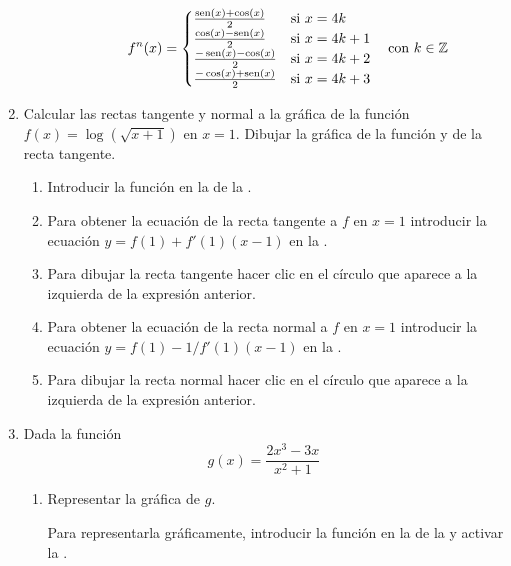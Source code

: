 \begin{enumerate}[leftmargin=*]
\begin{enumerate}
\begin{indication}
\begin{enumerate}
                  \[
                  f^n(x)=
                  \begin{cases}
                  \frac{\operatorname{sen}(x)+\cos(x)}{2}  & \mbox{si $x=4k$}   \\
                  \frac{\cos(x)-\operatorname{sen}(x)}{2}  & \mbox{si $x=4k+1$} \\
                  \frac{-\operatorname{sen}(x)-\cos(x)}{2} & \mbox{si $x=4k+2$} \\
                  \frac{-\cos(x)+\operatorname{sen}(x)}{2} & \mbox{si $x=4k+3$} \\
                  \end{cases}
                  \quad \mbox{con $k\in \mathbb{Z}$}
                  \]
            \end{enumerate}
            \end{indication}
      \end{enumerate}

\item Calcular las rectas tangente y normal a la gráfica de la función $f(x)=\log(\sqrt{x+1})$ en $x=1$.
      Dibujar la gráfica de la función y de la recta tangente.
      \begin{indication}
      \begin{enumerate}
      \item Introducir la función  en la  de la .
      \item Para obtener la ecuación de la recta tangente a $f$ en $x=1$ introducir la ecuación $y=f(1)+f'(1)(x-1)$ en la .
      \item Para dibujar la recta tangente hacer clic en el círculo que aparece a la izquierda de la expresión anterior.
      \item Para obtener la ecuación de la recta normal a $f$ en $x=1$ introducir la ecuación $y=f(1)-1/f'(1)(x-1)$ en la .
      \item Para dibujar la recta normal hacer clic en el círculo que aparece a la izquierda de la expresión anterior.
      \end{enumerate}
      \end{indication}



\item Dada la función
      \[
      g(x)=\dfrac{2x^{3}-3x}{x^{2}+1}
      \]

      \begin{enumerate}
      \item Representar la gráfica de $g$.
            \begin{indication}
            Para representarla gráficamente, introducir la función  en la  de la  y activar la .
            \end{indication}


\end{enumerate}
\end{enumerate}
